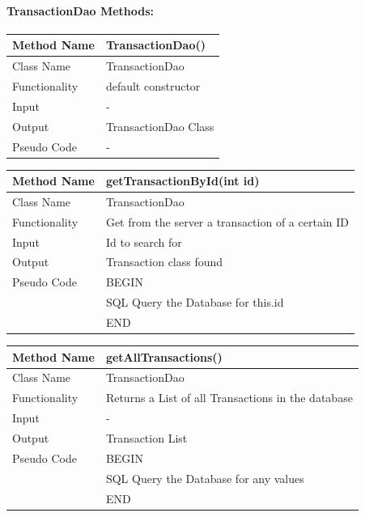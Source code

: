 \documentclass[12pt]{article}
\begin{document}
\paragraph{TransactionDao Methods:}
\begin{tabular}{ |p{3cm}||p{\colWidth}|  }
	\hline
	Method Name & TransactionDao()\\
	\hline
	Class Name & TransactionDao\\
	\hline
	Functionality & default constructor\\
	\hline
	Input & -\\
	\hline
	Output & TransactionDao Class\\
	\hline
	Pseudo Code & -\\
	\hline
\end{tabular}



\begin{tabular}{ |p{3cm}||p{\colWidth}|  }
	\hline
	Method Name & getTransactionById(int id)\\
	\hline
	Class Name & TransactionDao\\
	\hline
	Functionality & Get from the server a transaction of a certain ID\\
	\hline
	Input & Id to search for\\
	\hline
	Output & Transaction class found\\
	\hline
	Pseudo Code& BEGIN \\ & SQL Query the Database for this.id\\ &END\\
	\hline
\end{tabular}



\begin{tabular}{ |p{3cm}||p{\colWidth}|  }
	\hline
	Method Name & getAllTransactions()\\
	\hline
	Class Name & TransactionDao\\
	\hline
	Functionality & Returns a List of all Transactions in the database\\
	\hline
	Input & -\\
	\hline
	Output & Transaction List\\
	\hline
	Pseudo Code& BEGIN \\ & SQL Query the Database for any values\\ & END\\
	\hline
\end{tabular}\\
\end{document}
